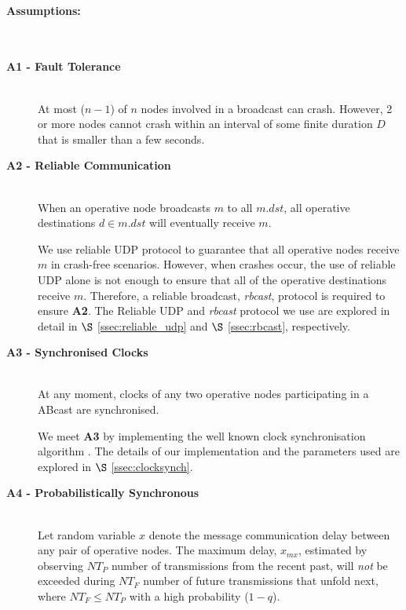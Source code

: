 	\paragraph{Assumptions:}\hspace{0pt} \\
	\begin{description}	
		\item [\textbf{A1 - Fault Tolerance}] \hfill \\
		At most ($n-1$) of $n$ nodes involved in a broadcast can crash. However, 2 or more nodes cannot crash within an interval of some finite duration $D$ that is smaller than a few seconds.
		
		\item [\textbf{A2 - Reliable Communication}] \hfill \\
		When an operative node broadcasts $m$ to all $m.dst$, all operative destinations $d \in m.dst$ will eventually receive $m$.  
		
		We use reliable UDP protocol to guarantee that all operative nodes receive $m$ in crash-free scenarios.  However, when crashes occur, the use of reliable UDP alone is not enough to ensure that all of the operative destinations receive $m$.  Therefore, a reliable broadcast, \emph{rbcast}, protocol is required to ensure \textbf{A2}.  The Reliable UDP and \emph{rbcast} protocol we use are explored in detail in $\S$ \ref{ssec:reliable_udp} and $\S$ \ref{ssec:rbcast}, respectively.  
		
		\item [\textbf{A3 - Synchronised Clocks}] \hfill \\
		At any moment, clocks of any two operative nodes participating in a \textsf{ABcast} are synchronised.  
		
		We meet \textbf{A3} by implementing the well known clock synchronisation algorithm \citep{Cristian:1996:SA:227210.227231}.  The details of our implementation and the parameters used are explored in $\S$ \ref{ssec:clocksynch}.
		
		\item [\textbf{A4 - Probabilistically Synchronous}] \hfill \\
        Let random variable $x$ denote the message communication delay between any pair of operative nodes. The maximum delay, $x_{mx}$, estimated by observing $NT_P$ number of transmissions from the recent past, will \emph{not} be exceeded during $NT_F$ number of future transmissions that unfold next, where $NT_F \leq NT_P$ with a high probability ($1 - q$).
		

\end{description}
